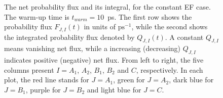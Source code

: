 \documentclass[a4paper,preprint,unsortedaddress,onecolumn]{revtex4-1}
\begin{document}
\begin{figure}
  \caption{
    The net probability flux and its integral, for the constant EF case.
    The warm-up time is $t_{warm} = 10$~ps.
    The first row shows the probability flux $F_{J,I}(t)$ in units of $\textrm{ps}^{-1}$, while the second
    shows the integrated  probability flux denoted by $Q_{J,I}(t)$.
    A constant $Q_{J,I}$ means vanishing net flux, while a increasing (decreasing)
    $Q_{J,I}$ indicates positive (negative) net flux.
    From left to right, the five
    columns present $I = A_1$, $A_2$, $B_1$, $B_2$ and
    $C$, respectively. In each plot, the red line stands for $J=A_1$,
    green for $J=A_2$, dark blue for $J=B_1$, purple for $J=B_2$ and light blue
    for $J=C$. 
    }
  \label{fig:tmp6}
\end{figure}

\end{document}

